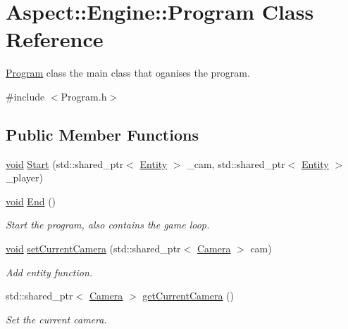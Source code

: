 \hypertarget{class_aspect_1_1_engine_1_1_program}{}\section{Aspect\+:\+:Engine\+:\+:Program Class Reference}
\label{class_aspect_1_1_engine_1_1_program}


\mbox{\hyperlink{class_aspect_1_1_engine_1_1_program}{Program}} class the main class that oganises the program.  




{\ttfamily \#include $<$Program.\+h$>$}

\subsection*{Public Member Functions}
\begin{DoxyCompactItemize}
\item 
\mbox{\hyperlink{_s_d_l__opengles2__gl2ext_8h_ae5d8fa23ad07c48bb609509eae494c95}{void}} \mbox{\hyperlink{class_aspect_1_1_engine_1_1_program_acd8c11ab08516997e18bc97412cb65cc}{Start}} (std\+::shared\+\_\+ptr$<$ \mbox{\hyperlink{class_aspect_1_1_engine_1_1_entity}{Entity}} $>$ \+\_\+cam, std\+::shared\+\_\+ptr$<$ \mbox{\hyperlink{class_aspect_1_1_engine_1_1_entity}{Entity}} $>$ \+\_\+player)
\item 
\mbox{\hyperlink{_s_d_l__opengles2__gl2ext_8h_ae5d8fa23ad07c48bb609509eae494c95}{void}} \mbox{\hyperlink{class_aspect_1_1_engine_1_1_program_aebf5093c9edb094862fc4fa0823d87e5}{End}} ()
\begin{DoxyCompactList}\small\item\em Start the program, also contains the game loop. \end{DoxyCompactList}\item 
\mbox{\hyperlink{_s_d_l__opengles2__gl2ext_8h_ae5d8fa23ad07c48bb609509eae494c95}{void}} \mbox{\hyperlink{class_aspect_1_1_engine_1_1_program_a2226e1a84c31b158c05492c9db9de1a2}{set\+Current\+Camera}} (std\+::shared\+\_\+ptr$<$ \mbox{\hyperlink{class_aspect_1_1_engine_1_1_camera}{Camera}} $>$ cam)
\begin{DoxyCompactList}\small\item\em Add entity function. \end{DoxyCompactList}\item 
std\+::shared\+\_\+ptr$<$ \mbox{\hyperlink{class_aspect_1_1_engine_1_1_camera}{Camera}} $>$ \mbox{\hyperlink{class_aspect_1_1_engine_1_1_program_a44f49997a17637fdc60a890c44f74eca}{get\+Current\+Camera}} ()
\begin{DoxyCompactList}\small\item\em Set the current camera. \end{DoxyCompactList}\end{DoxyCompactItemize}
